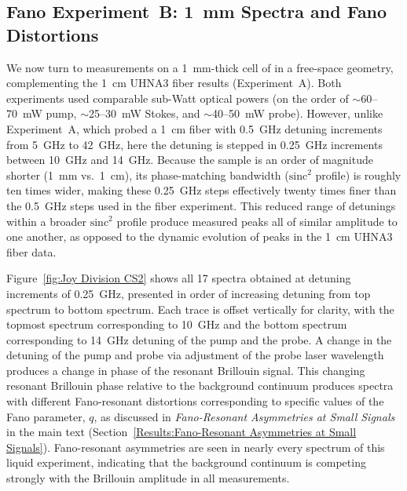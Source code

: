 \FloatBarrier

\subsection{Fano Experiment~B: \SI{1}{\milli\meter} \texorpdfstring{}{CS2} Spectra and Fano Distortions}
\label{Appendix:Fano:Experiment B}

We now turn to measurements on a \SI{1}{\milli\meter}-thick cell of  in a free-space geometry, complementing the \SI{1}{\centi\meter} UHNA3 fiber results (Experiment~A). Both experiments used comparable sub-Watt optical powers (on the order of \(\sim\)60–\SI{70}{\milli\watt} pump, \(\sim\)25–\SI{30}{\milli\watt} Stokes, and \(\sim\)40–\SI{50}{\milli\watt} probe). However, unlike Experiment~A, which probed a \SI{1}{\centi\meter} fiber with \SI{0.5}{\giga\hertz} detuning increments from \SI{5}{\giga\hertz} to \SI{42}{\giga\hertz}, here the detuning is stepped in \SI{0.25}{\giga\hertz} increments between \SI{10}{\giga\hertz} and \SI{14}{\giga\hertz}. Because the  sample is an order of magnitude shorter (\SI{1}{\milli\meter} vs.\ \SI{1}{\centi\meter}), its phase-matching bandwidth (\(\mathrm{sinc}^{2}\) profile) is roughly ten times wider, making these \SI{0.25}{\giga\hertz} steps effectively twenty times finer than the \SI{0.5}{\giga\hertz} steps used in the fiber experiment. This reduced range of detunings within a broader \(\mathrm{sinc^2}\) profile produce measured peaks all of similar amplitude to one another, as opposed to the dynamic evolution of peaks in the \SI{1}{\centi\meter} UHNA3 fiber data.

Figure~\ref{fig:Joy Division CS2} shows all 17 spectra obtained at detuning increments of \SI{0.25}{\giga\hertz}, presented in order of increasing detuning from top spectrum to bottom spectrum. Each trace is offset vertically for clarity, with the topmost spectrum corresponding to \SI{10}{\giga\hertz} and the bottom spectrum corresponding to \SI{14}{\giga\hertz} detuning of the pump and the probe. A change in the detuning of the pump and probe via adjustment of the probe laser wavelength produces a change in phase of the resonant Brillouin signal. This changing resonant Brillouin phase relative to the background continuum produces spectra with different Fano-resonant distortions corresponding to specific values of the Fano parameter, \(q\), as discussed in \textit{Fano-Resonant Asymmetries at Small Signals} in the main text (Section~\ref{Results:Fano-Resonant Asymmetries at Small Signals}). Fano-resonant asymmetries are seen in nearly every spectrum of this liquid experiment, indicating that the background continuum is competing strongly with the Brillouin amplitude in all measurements.

